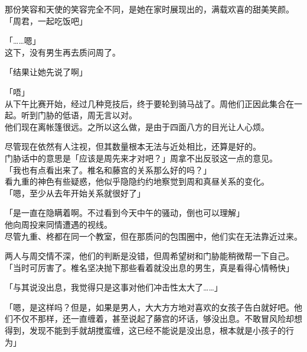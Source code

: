 那份笑容和天使的笑容完全不同，是她在家时展现出的，满载欢喜的甜美笑颜。\\

「周君，一起吃饭吧」

「……嗯」\\

这下，没有男生再去质问周了。\\

\vspace{2\baselineskip}

「结果让她先说了啊」

「唔」\\

从下午比赛开始，经过几种竞技后，终于要轮到骑马战了。周他们正因此集合在一起。听到门胁的低语，周无言以对。\\

他们现在离帐篷很远。之所以这么做，是由于四面八方的目光让人心烦。

尽管现在依然有人注视，但其数量根本无法与近处相比，还算是好的。\\

门胁话中的意思是「应该是周先来才对吧？」周拿不出反驳这一点的意见。\\

「我也有点看出来了。椎名和藤宫的关系那么好的吗？」\\

看九重的神色有些疑惑，他似乎隐隐约约地察觉到周和真昼关系的变化。\\

「嗯，至少从去年开始关系就很好了」

「是一直在隐瞒着啊。不过看到今天中午的骚动，倒也可以理解」\\

他向周投来同情遭遇的视线。\\

尽管九重、柊都在同一个教室，但在那质问的包围圈中，他们实在无法靠近过来。

两人与周交情不深，他们的判断是没错，但周希望树和门胁能稍微帮一下自己。\\

「当时可厉害了。椎名坚决抛下那些看着就没出息的男生，真是看得心情畅快」

「与其说没出息，我觉得只是这事对他们冲击性太大了……」

「嗯，是这样吗？但是，如果是男人，大大方方地对喜欢的女孩子告白就好吧。他们不仅不那样，还一直缠着，甚至说起了藤宫的坏话，够没出息。不敢冒风险却想得到，发现不能到手就胡搅蛮缠，这已经不能说是没出息，根本就是小孩子的行为」

